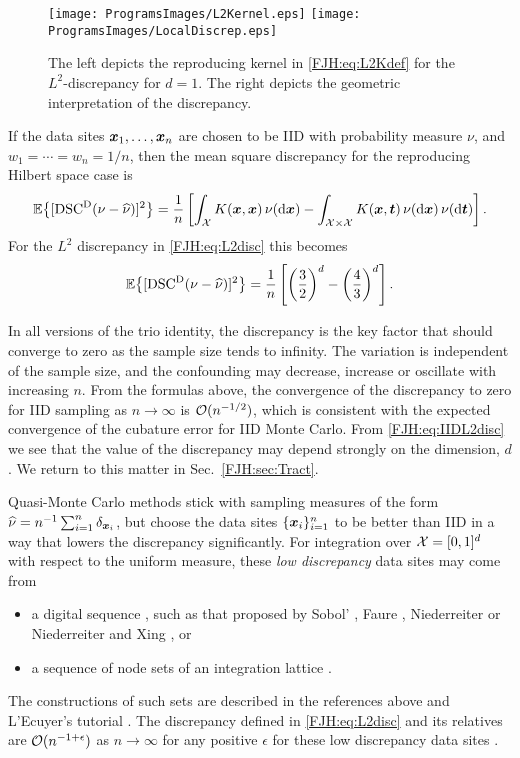 \documentclass[graybox,footinfo]{svmult}
\begin{document}
\begin{figure}
	\centering
	\texttt{[image: ProgramsImages/L2Kernel.eps]}\qquad
	\texttt{[image: ProgramsImages/LocalDiscrep.eps]}
	\caption{The left depicts the reproducing kernel in \eqref{FJH:eq:L2Kdef} for the 
	$L^2$-discrepancy 
	for $d=1$.  The right depicts the geometric interpretation of the discrepancy.
	\label{FJH:fig:L2ker}}
\end{figure}

If the data sites  ${\boldsymbol{x}}_{1}, \ldots, {\boldsymbol{x}}_{n}$ are chosen to be IID with probability measure 
$\nu$, and $w_1 = \cdots = w_n = 1/n$, then 
the mean square discrepancy for 
the reproducing Hilbert space case is
\begin{equation*}
{\mathbb{E}} \bigl\{[\textup{DSC}^{\textup{D}}(\nu - \widehat{\nu})]^2 \bigr \}  = \frac 1 n \left [ \int_{{\mathcal{X}}} K({\boldsymbol{x}},{\boldsymbol{x}}) \, 
\nu(\mathrm{d} 
{\boldsymbol{x}}) - 
\int_{{\mathcal{X}} \times {\mathcal{X}}} K({\boldsymbol{x}},{\boldsymbol{t}}) \, \nu(\mathrm{d} {\boldsymbol{x}}) \, \nu (\mathrm{d} {\boldsymbol{t}}) \right ].
\end{equation*}
For the $L^2$ discrepancy in \eqref{FJH:eq:L2disc} this becomes 
\begin{equation} \label{FJH:eq:IIDL2disc}
\bbE \bigl\{[\disc^{\Dt}(\nu - \hnu)]^2 \bigr \} = \frac 1 n \left [ \left(\frac 32\right)^d - 
\left(\frac 43\right)^d \right ].
\end{equation}

In all versions of the trio identity, the discrepancy is the key factor that should converge 
to 
zero as the sample size tends to infinity.  The variation is independent of the sample 
size, and the confounding may decrease, increase or oscillate with increasing $n$.  From 
the formulas above, the convergence of the discrepancy to zero for IID sampling as $n 
\to 
\infty$ is  ${\mathcal{O}}(n^{-1/2})$, which is consistent with the expected convergence of the 
cubature error for IID Monte Carlo.  From \eqref{FJH:eq:IIDL2disc} we see that the 
value of the discrepancy may depend strongly on the dimension, $d$.  We return 
to this matter in Sec.\  \ref{FJH:sec:Tract}.

Quasi-Monte Carlo methods stick with sampling measures of the form  $\widehat{\nu} = 
n^{-1}\sum_{i=1}^n \delta_{{\boldsymbol{x}}_i}$, but choose the data sites $\{{\boldsymbol{x}}_i\}_{i=1}^n$ to be 
better than IID in a way that lowers the discrepancy significantly.  For 
integration over ${\mathcal{X}} = [0,1]^d$ with 
respect to the uniform measure, these \emph{low discrepancy} data sites may come from
\begin{itemize} 
\item a digital sequence \cite{DicPil10a}, such as that proposed by Sobol' \cite{Sob67}, 
Faure \cite{Fau82}, Niederreiter \cite{Nie88} or Niederreiter and Xing \cite{NieXin96}, or 
\item a sequence of node sets of an integration lattice \cite{SloJoe94}.  
\end{itemize}
The 
constructions of such sets are described in the references above and L'Ecuyer's 
tutorial 
\cite{}.  The discrepancy defined in \eqref{FJH:eq:L2disc} and its relatives are 
${\mathcal{O}}(n^{-1+\epsilon})$ as $n \to \infty$ for any positive $\epsilon$ for these low 
discrepancy data sites \cite{Nie92}.  
\end{document}
